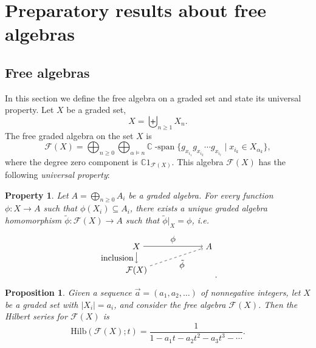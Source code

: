 \documentclass[11pt]{amsart}
\newtheorem{proposition}[theorem]{Proposition}
\newtheorem{property}[theorem]{Property}
\theoremstyle{definition}
\numberwithin{equation}{section}
\def\CC{{\mathbb C}}
\begin{document}
\section{Preparatory results about free algebras}

\subsection{Free algebras}
\label{sec:freealgebras}

In this section we define the free algebra on a graded set and state its universal property.  
Let $X$ be a graded set, 
\[
X = \biguplus_{n \ge 1} X_{n}.
\]
The free graded algebra on the set $X$ is 
\[
\mathcal{F}(X) = \bigoplus_{n \ge 0} \bigoplus_{\alpha \vDash n} 
\CC\operatorname{-span}\{g_{x_{i_{1}} }g_{x_{i_{2}}} \cdots g_{x_{i_{\ell}}} \;|\; x_{i_{k}} \in X_{\alpha_{k}}\},
\]
where the degree zero component is $\CC 1_{\mathcal{F}(X)}$.  This algebra $\mathcal{F}(X)$ has the following \emph{universal property}:

\begin{property}
\label{prop:universalfree}
Let $A = \bigoplus_{n \ge 0} A_{i}$ be a graded algebra.  For every function $\phi: X \to A$ such that $\phi(X_{i}) \subseteq A_{i}$, there exists a unique graded algebra homomorphism $\tilde{\phi}: \mathcal{F}(X) \to A$ such that $\tilde{\phi}|_{X} = \phi$, i.e.
\[
    \begin{tikzpicture}
        \node at (0, 0) (X) {$X$};
        \node at (3, 0) (F) {$A$};
        \node at (0, -1) (A) {$\mathcal{F}(X)$};
        \draw[->] (X) -- node[above] {$\phi$} (F);
        \draw[->] (X) -- node[left] {inclusion} (A);
        \draw[->, dashed] (A) -- node[below right] {$\tilde{\phi}$} (F);
        \end{tikzpicture}.
\]
\end{property}


\begin{proposition}
\label{prop: free algebra hilbert series}
Given a sequence $\vec{a} = (a_{1}, a_{2}, \ldots)$ of nonnegative integers, let $X$ be a graded set with $|X_{i}| = a_{i}$, and consider the free algebra $\mathcal{F}(X)$.  Then the Hilbert series for $\mathcal{F}(X)$ is
\[
\mathrm{Hilb}(\mathcal{F}(X); t) =  \frac{1}{1 - a_{1}t - a_{2}t^{2} - a_{3}t^{3} - \cdots}.
\]
%
%
%
%
%
%
%
%
\end{proposition}
\end{document}
